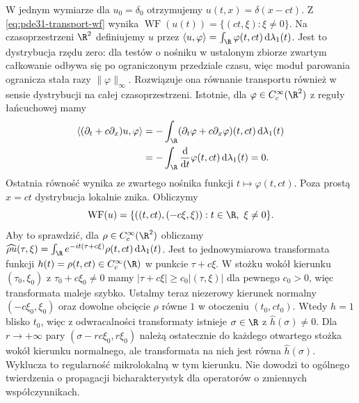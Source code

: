 \begin{przyklad}
\label{ex:pde31-moving-delta}
W jednym wymiarze dla $u_0=\delta_0$ otrzymujemy
$u(t,x)=\delta(x-ct)$. Z
\eqref{eq:pde31-transport-wf} wynika
$\operatorname{WF}(u(t))=\{(ct,\xi):\xi\ne0\}$.
Na czasoprzestrzeni $\R^2$ definiujemy $u$ przez
$\langle u,\varphi\rangle=\int_\R\varphi(t,ct)
\,\mathrm d\lambda_1(t)$.
Jest to dystrybucja rzędu zero: dla testów o nośniku
w ustalonym zbiorze zwartym całkowanie odbywa się
po ograniczonym przedziale czasu, więc moduł
parowania ogranicza stała razy $\|\varphi\|_\infty$.
Rozwiązuje ona równanie transportu również
w sensie dystrybucji na całej czasoprzestrzeni.
Istotnie, dla $\varphi\in C_c^\infty(\R^2)$
z reguły łańcuchowej mamy
\[
 \begin{aligned}
 \langle(\partial_t+c\partial_x)u,\varphi\rangle
 &=-\int_\R
 (\partial_t\varphi+c\partial_x\varphi)(t,ct)
 \,\mathrm d\lambda_1(t)\\
 &=-\int_\R\frac{\mathrm d}{\mathrm dt}\varphi(t,ct)
 \,\mathrm d\lambda_1(t)=0.
 \end{aligned}
\]
Ostatnia równość wynika ze zwartego nośnika
funkcji $t\mapsto\varphi(t,ct)$.
Poza prostą $x=ct$ dystrybucja lokalnie znika.
Obliczymy
\[
 \operatorname{WF}(u)=
 \{((t,ct),(-c\xi,\xi)):t\in\R,\ \xi\ne0\}.
\]
Aby to sprawdzić, dla $\rho\in C_c^\infty(\R^2)$
obliczamy
$\widehat{\rho u}(\tau,\xi)=
\int_\R e^{-it(\tau+c\xi)}\rho(t,ct)\,
\mathrm d\lambda_1(t)$.
Jest to jednowymiarowa transformata funkcji
$h(t)=\rho(t,ct)\in C_c^\infty(\R)$ w punkcie
$\tau+c\xi$. W stożku wokół kierunku
$(\tau_0,\xi_0)$ z $\tau_0+c\xi_0\ne0$
mamy $|\tau+c\xi|\ge c_0|(\tau,\xi)|$
dla pewnego $c_0>0$, więc transformata
maleje szybko.
Ustalmy teraz niezerowy kierunek normalny
$(-c\xi_0,\xi_0)$ oraz dowolne obcięcie $\rho$
równe $1$ w otoczeniu $(t_0,ct_0)$.
Wtedy $h=1$ blisko $t_0$, więc z odwracalności
transformaty istnieje $\sigma\in\R$ z
$\widehat h(\sigma)\ne0$.
Dla $r\to+\infty$ pary
$(\sigma-rc\xi_0,r\xi_0)$ należą ostatecznie
do każdego otwartego stożka wokół kierunku
normalnego, ale transformata na nich jest
równa $\widehat h(\sigma)$. Wyklucza to
regularność mikrolokalną w tym kierunku.
Nie dowodzi to ogólnego twierdzenia o propagacji
bicharakterystyk dla operatorów o zmiennych współczynnikach.
\end{przyklad}


